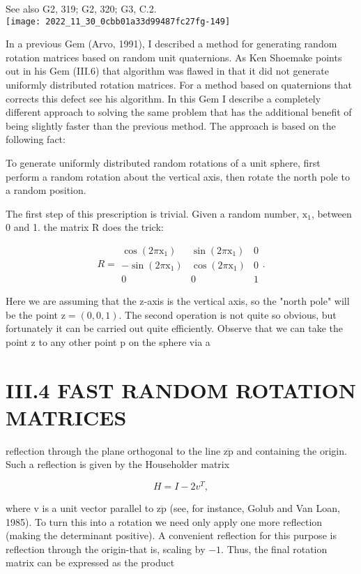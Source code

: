 See also G2, 319; G2, 320; G3, C.2.\\
\texttt{[image: 2022\_11\_30\_0cbb01a33d99487fc27fg-149]}

In a previous Gem (Arvo, 1991), I described a method for generating random rotation matrices based on random unit quaternions. As Ken Shoemake points out in his Gem (III.6) that algorithm was flawed in that it did not generate uniformly distributed rotation matrices. For a method based on quaternions that corrects this defect see his algorithm. In this Gem I describe a completely different approach to solving the same problem that has the additional benefit of being slightly faster than the previous method. The approach is based on the following fact:

To generate uniformly distributed random rotations of a unit sphere, first perform a random rotation about the vertical axis, then rotate the north pole to a random position.

The first step of this prescription is trivial. Given a random number, $\mathrm{x}_{1}$, between 0 and 1. the matrix $\mathrm{R}$ does the trick:

$$
R=\begin{array}{ccc}
\cos \left(2 \pi \mathrm{x}_{1}\right) & \sin \left(2 \pi \mathrm{x}_{1}\right) & 0 \\
-\sin \left(2 \pi \mathrm{x}_{1}\right) & \cos \left(2 \pi \mathrm{x}_{1}\right) & 0 \\
0 & 0 & 1
\end{array} .
$$

Here we are assuming that the z-axis is the vertical axis, so the "north pole" will be the point $\mathrm{z}=(0,0,1)$. The second operation is not quite so obvious, but fortunately it can be carried out quite efficiently. Observe that we can take the point $\mathrm{z}$ to any other point $\mathrm{p}$ on the sphere via a

\section{III.4 FAST RANDOM ROTATION MATRICES}
reflection through the plane orthogonal to the line $\overline{\mathrm{zp}}$ and containing the origin. Such a reflection is given by the Householder matrix

$$
H=I-2 v^{T},
$$

where $\mathrm{v}$ is a unit vector parallel to $\overline{\mathrm{zp}}$ (see, for instance, Golub and Van Loan, 1985). To turn this into a rotation we need only apply one more reflection (making the determinant positive). A convenient reflection for this purpose is reflection through the origin-that is, scaling by $-1$. Thus, the final rotation matrix can be expressed as the product

